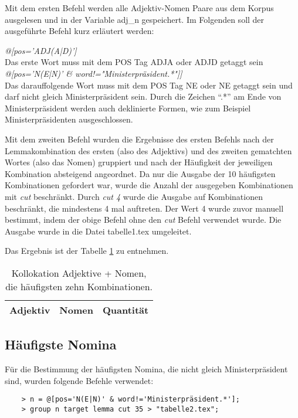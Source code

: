 \documentclass[%
	type=document,%
  	style=article,%
  	media=print,
  	pages=oneside,%
  	prefixLecturer=Dozenten:,
  	author=multiple,
]{unihildesheim}
\begin{document}
Mit dem ersten Befehl werden alle Adjektiv-Nomen Paare aus dem Korpus ausgelesen
und in der Variable adj\_n gespeichert. Im Folgenden soll der ausgeführte Befehl
kurz erläutert werden:
\begin{enumerate}
  \textitem \textit{@[pos='ADJ(A|D)']} \\
			Das erste Wort muss mit dem POS Tag ADJA oder ADJD getaggt sein
  \textitem \textit{@[pos='N(E|N)' \& word!="Ministerpräsident.*"]]} \\
			Das darauffolgende Wort muss mit dem POS Tag NE oder NE getaggt sein und darf
			nicht gleich Ministerpräsident sein. Durch die Zeichen "`.*"' am Ende von
			Ministerpräsident werden auch deklinierte Formen, wie zum Beispiel
			Ministerpräsidenten ausgeschlossen.
\end{enumerate}

Mit dem zweiten Befehl wurden die Ergebnisse des ersten Befehls nach der
Lemmakombination des ersten (also des Adjektivs) und des zweiten gematchten
Wortes (also das Nomen) gruppiert und nach der Häufigkeit der jeweiligen
Kombination absteigend angeordnet. Da nur die Ausgabe der 10 häufigsten
Kombinationen gefordert war, wurde die Anzahl der ausgegeben Kombinationen
mit \textit{cut} beschränkt. Durch \textit{cut 4} wurde die Ausgabe auf Kombinationen
beschränkt, die mindestens 4 mal auftreten. Der Wert 4 wurde zuvor manuell
bestimmt, indem der obige Befehl ohne den \textit{cut} Befehl verwendet wurde. Die
Ausgabe wurde in die Datei tabelle1.tex umgeleitet.

Das Ergebnis ist der Tabelle \ref{tab:adjektive_nomina} zu entnehmen.

\begin{table}[htpb]\label{t}
	\center
	\begin{tabularx}{0.6\textwidth}{llr}
		\toprule
		\textbf{Adjektiv} & \textbf{Nomen} & \textbf{Quantität}\\
		\midrule
		
		\bottomrule
	\end{tabularx}
	\caption{Kollokation Adjektive + Nomen, die häufigsten zehn Kombinationen.}
	\label{tab:adjektive_nomina}
\end{table}

\subsection{Häufigste Nomina}
Für die Bestimmung der häufigsten Nomina, die nicht gleich Ministerpräsident
sind, wurden folgende Befehle verwendet:
\begin{verbatim}
	> n = @[pos='N(E|N)' & word!='Ministerpräsident.*'];
	> group n target lemma cut 35 > "tabelle2.tex";
\end{verbatim}
\end{document}

